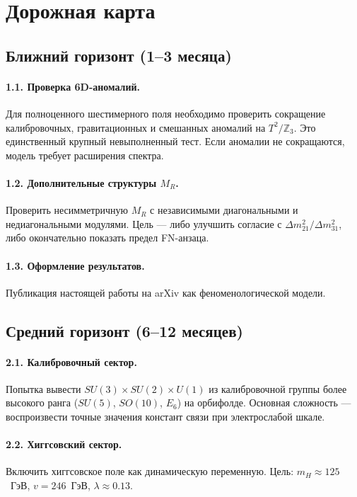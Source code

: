 \documentclass[11pt,a4paper]{article}
\numberwithin{equation}{section}
\begin{document}
\section{Дорожная карта}

\subsection{Ближний горизонт (1--3 месяца)}

\paragraph{1.1. Проверка 6D-аномалий.}
Для полноценного шестимерного поля необходимо
проверить сокращение калибровочных, гравитационных
и смешанных аномалий на $T^2/\mathbb{Z}_3$. Это
единственный крупный невыполненный тест. Если
аномалии не сокращаются, модель требует расширения
спектра.

\paragraph{1.2. Дополнительные структуры $M_R$.}
Проверить несимметричную $M_R$ с независимыми
диагональными и недиагональными модулями.
Цель --- либо улучшить согласие с
$\Delta m^2_{21}/\Delta m^2_{31}$, либо окончательно
показать предел FN-анзаца.

\paragraph{1.3. Оформление результатов.}
Публикация настоящей работы на arXiv как
феноменологической модели.

\subsection{Средний горизонт (6--12 месяцев)}

\paragraph{2.1. Калибровочный сектор.}
Попытка вывести $SU(3)\times SU(2)\times U(1)$
из калибровочной группы более высокого ранга
($SU(5)$, $SO(10)$, $E_6$) на орбифолде.
Основная сложность --- воспроизвести точные
значения констант связи при электрослабой шкале.

\paragraph{2.2. Хиггсовский сектор.}
Включить хиггсовское поле как динамическую
переменную. Цель: $m_H \approx 125$~ГэВ,
$v = 246$~ГэВ, $\lambda \approx 0.13$.
\end{document}

